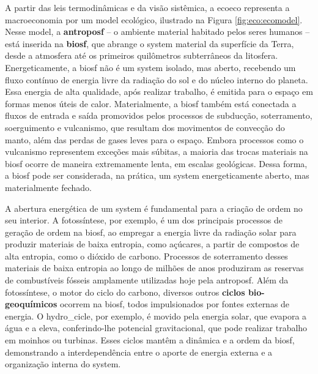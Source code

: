 \documentclass[./main.tex]{subfiles}
\begin{document}
\par A partir das leis termodinâmicas e da visão sistêmica, a \gls{ecoeco} representa a macroeconomia por um \gls{model} ecológico, ilustrado na Figura \ref{fig:eco:ecomodel}. Nesse \gls{model}, a \textbf{\gls{antroposf}} – o ambiente material habitado pelos seres humanos – está inserida na \textbf{\gls{biosf}}, que abrange o \gls{system} material da superfície da Terra, desde a atmosfera até os primeiros quilômetros subterrâneos da litosfera. Energeticamente, a \gls{biosf} não é um \gls{system} isolado, mas aberto, recebendo um fluxo contínuo de energia livre da radiação do sol e do núcleo interno do planeta. Essa energia de alta qualidade, após realizar trabalho, é emitida para o espaço em formas menos úteis de calor. Materialmente, a \gls{biosf} também está conectada a fluxos de entrada e saída promovidos pelos processos de subducção, soterramento, soerguimento e vulcanismo, que resultam dos movimentos de convecção do manto, além das perdas de gases leves para o espaço. Embora processos como o vulcanismo representem exceções mais súbitas, a maioria das trocas materiais na \gls{biosf} ocorre de maneira extremamente lenta, em escalas geológicas. Dessa forma, a \gls{biosf} pode ser considerada, na prática, um \gls{system} energeticamente aberto, mas materialmente fechado.

\par A abertura energética de um \gls{system} é fundamental para a criação de ordem no seu interior. A fotossíntese, por exemplo, é um dos principais processos de geração de ordem na \gls{biosf}, ao empregar a energia livre da radiação solar para produzir materiais de baixa entropia, como açúcares, a partir de compostos de alta entropia, como o dióxido de carbono. Processos de soterramento desses materiais de baixa entropia ao longo de milhões de anos produziram as reservas de combustíveis fósseis amplamente utilizadas hoje pela \gls{antroposf}. Além da fotossíntese, o motor do ciclo do carbono, diversos outros \textbf{ciclos bio-geoquímicos} ocorrem na \gls{biosf}, todos impulsionados por fontes externas de energia. O \gls{hydro_cicle}, por exemplo, é movido pela energia solar, que evapora a água e a eleva, conferindo-lhe potencial gravitacional, que pode realizar trabalho em moinhos ou turbinas. Esses ciclos mantêm a dinâmica e a ordem da \gls{biosf}, demonstrando a interdependência entre o aporte de energia externa e a organização interna do \gls{system}.
\end{document}
